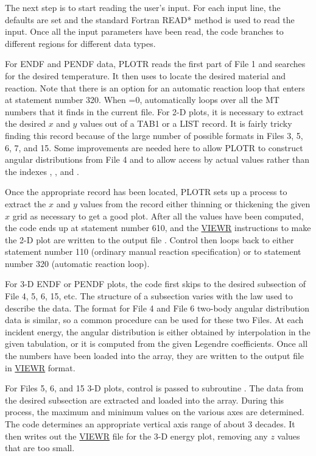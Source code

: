 The next step is to start reading the user's input.  For each input
line, the defaults are set and the standard Fortran READ* method is
used to read the input.  Once all the input parameters have been read,
the code branches to different regions for different data types.

For ENDF and PENDF data, PLOTR reads the first part of File 1
and searches for the desired temperature.  It then uses
to locate the desired material and reaction.  Note that there
is an option for an automatic reaction loop that enters at
statement number 320.  When =0,  automatically
loops over all the MT numbers that it finds in the current file.
For 2-D plots, it is necessary to extract the desired $x$ and $y$ values
out of a TAB1 or a LIST record.  It is fairly tricky finding
this record because of the large number of possible formats
in Files 3, 5, 6, 7, and 15.  Some improvements are
needed here to allow PLOTR to construct angular distributions
from File 4 and to allow access by actual values rather than
the indexes , , and .

Once the appropriate record has been located, PLOTR sets up
a process to extract the $x$ and $y$ values from the record
either thinning or thickening the given $x$ grid as necessary
to get a good plot.  After all the values have been computed,
the code ends up at statement number 610, and the
\hyperlink{sVIEWRhy}{VIEWR}
instructions to make the 2-D plot are written to the output
file .  Control then loops back to either statement
number 110 (ordinary manual reaction specification) or to
statement number 320 (automatic reaction loop).

For 3-D ENDF or PENDF plots, the code first skips to the
desired subsection of File 4, 5, 6, 15, etc.  The structure
of a subsection varies with the law used to describe the
data.  The format for File 4 and File 6 two-body angular
distribution data is similar, so a common procedure
can be used for these two Files.  At each incident energy, the
angular distribution is either obtained by interpolation in
the given tabulation, or it is computed from the given Legendre
coefficients.  Once all the numbers have been loaded into the
 array, they are written to the output 
file in \hyperlink{sVIEWRhy}{VIEWR} format.

For Files 5, 6, and 15 3-D plots, control is passed to subroutine
.
 The data from the desired subsection are extracted
and loaded into the  array.  During this process, the maximum
and minimum values on the various axes are determined. The code
determines an appropriate vertical axis range of about 3 decades.
It then writes out the \hyperlink{sVIEWRhy}{VIEWR} file
for the 3-D energy plot, removing
any $z$ values that are too small.

